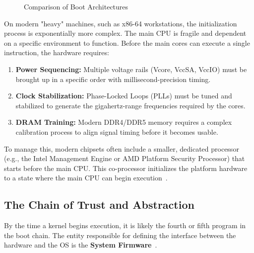 \documentclass[a4paper,10pt,twoside]{report}
\theoremstyle{definition}
\begin{document}
\begin{figure}[htbp]
\caption{Comparison of Boot Architectures}
\label{fig:boot_methods}
\end{figure}

On modern "heavy" machines, such as x86-64 workstations, the initialization process is exponentially more complex. The main CPU is fragile and dependent on a specific environment to function. Before the main cores can execute a single instruction, the hardware requires:
\begin{enumerate}
    \item \textbf{Power Sequencing:} Multiple voltage rails (Vcore, VccSA, VccIO) must be brought up in a specific order with millisecond-precision timing.
    \item \textbf{Clock Stabilization:} Phase-Locked Loops (PLLs) must be tuned and stabilized to generate the gigahertz-range frequencies required by the cores.
    \item \textbf{DRAM Training:} Modern DDR4/DDR5 memory requires a complex calibration process to align signal timing before it becomes usable.
\end{enumerate}

To manage this, modern chipsets often include a smaller, dedicated processor (e.g., the Intel Management Engine or AMD Platform Security Processor) that starts before the main CPU. This co-processor initializes the platform hardware to a state where the main CPU can begin execution~\cite{Intel-Datasheet-Vol1}. 

\subsection{The Chain of Trust and Abstraction}
\label{subsubsec:chain_of_trust_and_abstraction}
By the time a kernel begins execution, it is likely the fourth or fifth program in the boot chain. The entity responsible for defining the interface between the hardware and the OS is the \textbf{System Firmware}~\cite{UEFI-Base-Spec, UEFI-PI-Spec}.
\end{document}

